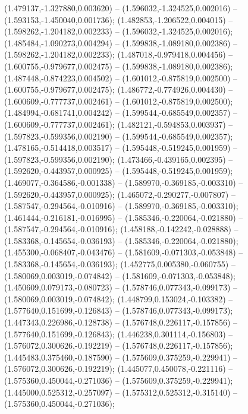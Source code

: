  (1.479137,-1.327880,0.003620) -- (1.596032,-1.324525,0.002016) -- (1.593153,-1.450040,0.001736);
 (1.482853,-1.206522,0.004015) -- (1.598262,-1.204182,0.002233) -- (1.596032,-1.324525,0.002016);
 (1.485484,-1.090273,0.004294) -- (1.599838,-1.089180,0.002386) -- (1.598262,-1.204182,0.002233);
 (1.487018,-0.979418,0.004456) -- (1.600755,-0.979677,0.002475) -- (1.599838,-1.089180,0.002386);
 (1.487448,-0.874223,0.004502) -- (1.601012,-0.875819,0.002500) -- (1.600755,-0.979677,0.002475);
 (1.486772,-0.774926,0.004430) -- (1.600609,-0.777737,0.002461) -- (1.601012,-0.875819,0.002500);
 (1.484994,-0.681741,0.004242) -- (1.599544,-0.685549,0.002357) -- (1.600609,-0.777737,0.002461);
 (1.482121,-0.594853,0.003937) -- (1.597823,-0.599356,0.002190) -- (1.599544,-0.685549,0.002357);
 (1.478165,-0.514418,0.003517) -- (1.595448,-0.519245,0.001959) -- (1.597823,-0.599356,0.002190);
 (1.473466,-0.439165,0.002395) -- (1.592620,-0.443957,0.000925) -- (1.595448,-0.519245,0.001959);
 (1.469077,-0.364586,-0.001338) -- (1.589970,-0.369185,-0.003310) -- (1.592620,-0.443957,0.000925);
 (1.465072,-0.290277,-0.007807) -- (1.587547,-0.294564,-0.010916) -- (1.589970,-0.369185,-0.003310);
 (1.461444,-0.216181,-0.016995) -- (1.585346,-0.220064,-0.021880) -- (1.587547,-0.294564,-0.010916);
 (1.458188,-0.142242,-0.028888) -- (1.583368,-0.145654,-0.036193) -- (1.585346,-0.220064,-0.021880);
 (1.455300,-0.068407,-0.043476) -- (1.581609,-0.071303,-0.053848) -- (1.583368,-0.145654,-0.036193);
 (1.452775,0.005380,-0.060755) -- (1.580069,0.003019,-0.074842) -- (1.581609,-0.071303,-0.053848);
 (1.450609,0.079173,-0.080723) -- (1.578746,0.077343,-0.099173) -- (1.580069,0.003019,-0.074842);
 (1.448799,0.153024,-0.103382) -- (1.577640,0.151699,-0.126843) -- (1.578746,0.077343,-0.099173);
 (1.447343,0.226986,-0.128738) -- (1.576748,0.226117,-0.157856) -- (1.577640,0.151699,-0.126843);
 (1.446238,0.301114,-0.156803) -- (1.576072,0.300626,-0.192219) -- (1.576748,0.226117,-0.157856);
 (1.445483,0.375460,-0.187590) -- (1.575609,0.375259,-0.229941) -- (1.576072,0.300626,-0.192219);
 (1.445077,0.450078,-0.221116) -- (1.575360,0.450044,-0.271036) -- (1.575609,0.375259,-0.229941);
 (1.445000,0.525312,-0.257097) -- (1.575312,0.525312,-0.315140) -- (1.575360,0.450044,-0.271036);
